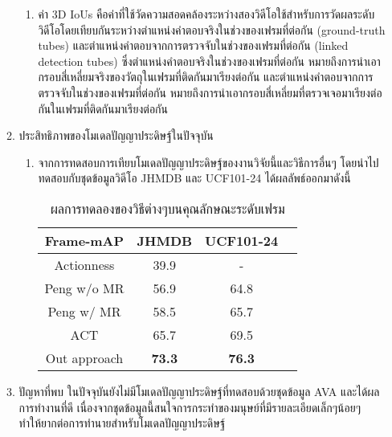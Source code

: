 \begin{enumerate}
\begin{enumerate}
\begin{enumerate}
			\item ค่า 3D IoUs คือค่าที่ใช้วัดความสอดคล้องระหว่างสองวิดีโอใช้สำหรับการวัดผลระดับวิดีโอโดยเทียบกันระหว่างตำแหน่งคำตอบจริงในช่วงของเฟรมที่ต่อกัน (ground-truth tubes) 
			และตำแหน่งคำตอบจากการตรวจจับในช่วงของเฟรมที่ต่อกัน (linked detection tubes) ซึ่งตำแหน่งคำตอบจริงในช่วงของเฟรมที่ต่อกัน หมายถึงการนำเอากรอบสี่เหลี่ยมจริงของวัตถุในเฟรมที่ติดกันมาเรียงต่อกัน 
			และตำแหน่งคำตอบจากการตรวจจับในช่วงของเฟรมที่ต่อกัน หมายถึงการนำเอากรอบสี่เหลี่ยมที่ตรวจเจอมาเรียงต่อกันในเฟรมที่ติดกันมาเรียงต่อกัน
		\end{enumerate}
		\item ประสิทธิภาพของโมเดลปัญญาประดิษฐ์ในปัจจุบัน
		\begin{enumerate}
			\item จากการทดสอบการเทียบโมเดลปัญญาประดิษฐ์ของงานวิจัยนี้และวิธีการอื่นๆ โดยนำไปทดสอบกับชุดข้อมูลวิดีโอ JHMDB และ UCF101-24 ได้ผลลัพธ์ออกมาดังนี้
			\begin{table}[!ht]
				\centering
				\begin{tabular}{|c|c|c|c|}
					\hline
					{Frame-mAP}&{JHMDB}&{UCF101-24}\\
					\hline
					Actionness 			& 39.9				& 	-						\\
					Peng w/o MR			& 56.9				& 64.8						\\
					Peng w/  MR 		& 58.5				& 65.7						\\
					ACT					& 65.7				& 69.5						\\
					\hline
					Out approach		& \textbf{73.3}		& \textbf{76.3}				\\
					\hline
				\end{tabular}
				\caption{ผลการทดลองของวิธีต่างๆบนคุณลักษณะระดับเฟรม}
				\label{tab: transfer learning}
			\end{table}
		\end{enumerate}
		\item ปัญหาที่พบ
		ในปัจจุบันยังไม่มีโมเดลปัญญาประดิษฐ์ที่ทดสอบด้วยชุดข้อมูล AVA และได้ผลการทำงานที่ดี เนื่องจากชุดข้อมูลนี้สนใจการกระทำของมนุษย์ที่มีรายละเอียดเล็กๆน้อยๆ 
		ทำให้ยากต่อการทำนายสำหรับโมเดลปัญญาประดิษฐ์
	\end{enumerate}
\end{enumerate}
\clearpage
